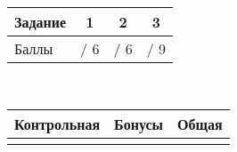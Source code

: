 \documentclass[12pt,a4paper]{scrartcl}
\begin{document}
\begin{center}
\renewcommand{\arraystretch}{1.3}
  \begin{tabular}{|p{5cm}||c|c|c|}
    \hline
    Задание & 1 & 2 & 3  \\
    \hline
    Баллы & \phantom{XXXXXX}/ 6 & \phantom{XXXXXX}/ 6 & \phantom{XXXXXX}/ 9  \\
    \hline
  \end{tabular}\\[5ex]

  \begin{tabular}{|p{4.2cm}|p{4.2cm}|p{4.2cm}|}
    \hline
    Контрольная & Бонусы & Общая  \\
    \hline
     &   &  \\[1ex]
    \hline
  \end{tabular}
  
\end{center}

\newpage 
 
\end{document}
